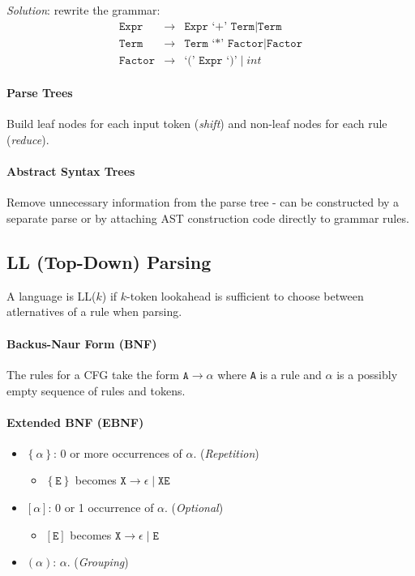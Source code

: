 \documentclass[twocolumn,english]{article}
\begin{document}
\emph{Solution}: rewrite the grammar:
\begin{align*}
\texttt{Expr} & \rightarrow & \texttt{Expr `+' Term}\mid\texttt{Term}\\
\texttt{Term} & \rightarrow & \texttt{Term `*' Factor}\mid\texttt{Factor}\\
\texttt{Factor} & \rightarrow & \texttt{`(' Expr `)'}\mid int
\end{align*}


\paragraph{Parse Trees}

Build leaf nodes for each input token (\emph{shift}) and non-leaf
nodes for each rule (\emph{reduce}).

\paragraph{Abstract Syntax Trees}

Remove unnecessary information from the parse tree - can be constructed
by a separate parse or by attaching AST construction code directly
to grammar rules.

\subsection{LL (Top-Down) Parsing}

A language is LL($k$) if $k$-token lookahead is sufficient to choose
between atlernatives of a rule when parsing.

\paragraph{Backus-Naur Form (BNF)}

The rules for a CFG take the form $\texttt{A}\rightarrow\alpha$ where
\texttt{A} is a rule and $\alpha$ is a possibly empty sequence of
rules and tokens.

\paragraph{Extended BNF (EBNF)}
\begin{itemize}
\item $\left\{ \alpha\right\} $: 0 or more occurrences of $\alpha$. (\emph{Repetition})
\begin{itemize}
\item $\left\{ \texttt{E}\right\} $ becomes $\texttt{X}\rightarrow\epsilon\mid\texttt{XE}$
\end{itemize}
\item $\left[\alpha\right]$: 0 or 1 occurrence of $\alpha$. (\emph{Optional})
\begin{itemize}
\item $\left[\texttt{E}\right]$ becomes $\texttt{X}\rightarrow\epsilon\mid\texttt{E}$
\end{itemize}
\item $\left(\alpha\right)$: $\alpha$. (\emph{Grouping})
\end{itemize}
\end{document}

